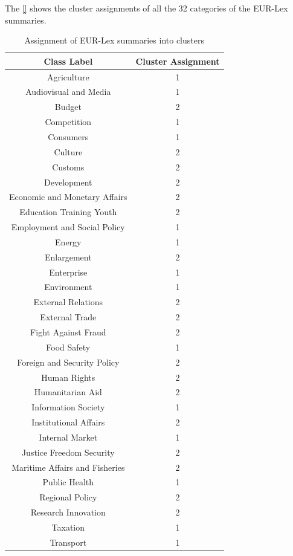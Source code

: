 The \ref{} shows the cluster assignments of all the 32 categories of the EUR-Lex summaries.

\begin{table}[!ht]
\centering
\begin{tabular}{cc}
\hline
\textbf{Class Label} & \textbf{Cluster Assignment} \\ \hline
Agriculture & 1 \\ 
Audiovisual and Media & 1 \\ 
Budget & 2 \\ 
Competition & 1 \\ 
Consumers & 1 \\ 
Culture & 2 \\ 
Customs & 2 \\ 
Development & 2 \\ 
Economic and Monetary Affairs & 2 \\ 
Education Training Youth & 2 \\ 
Employment and Social Policy & 1 \\ 
Energy & 1 \\ 
Enlargement & 2 \\ 
Enterprise & 1 \\ 
Environment & 1 \\ 
External Relations & 2 \\ 
External Trade & 2 \\ 
Fight Against Fraud & 2 \\ 
Food Safety & 1 \\ 
Foreign and Security Policy & 2 \\ 
Human Rights & 2 \\ 
Humanitarian Aid & 2 \\ 
Information Society & 1 \\ 
Institutional Affairs & 2 \\ 
Internal Market & 1 \\ 
Justice Freedom Security & 2 \\ 
Maritime Affairs and Fisheries & 2 \\ 
Public Health & 1 \\ 
Regional Policy & 2 \\ 
Research Innovation & 2 \\ 
Taxation & 1 \\ 
Transport & 1 \\ \hline
\end{tabular}
\caption{Assignment of EUR-Lex summaries into clusters}
\label{table:ClusterAssignments32Classes}
\end{table}



